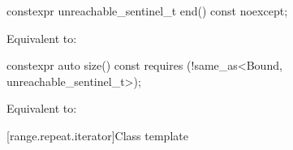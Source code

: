 %
\begin{itemdecl}
constexpr unreachable_sentinel_t end() const noexcept;
\end{itemdecl}

\begin{itemdescr}
\pnum
\effects
Equivalent to: 
\end{itemdescr}

%
\begin{itemdecl}
constexpr auto size() const requires (!same_as<Bound, unreachable_sentinel_t>);
\end{itemdecl}

\begin{itemdescr}
\pnum
\effects
Equivalent to: 
\end{itemdescr}

[range.repeat.iterator]{Class template }

